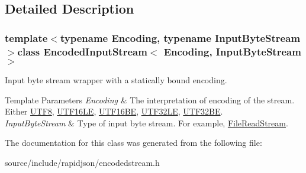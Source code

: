 \subsection{Detailed Description}
\subsubsection*{template$<$typename Encoding, typename Input\+Byte\+Stream$>$class Encoded\+Input\+Stream$<$ Encoding, Input\+Byte\+Stream $>$}

Input byte stream wrapper with a statically bound encoding. 


\begin{DoxyTemplParams}{Template Parameters}
{\em Encoding} & The interpretation of encoding of the stream. Either \hyperlink{struct_u_t_f8}{U\+T\+F8}, \hyperlink{struct_u_t_f16_l_e}{U\+T\+F16\+L\+E}, \hyperlink{struct_u_t_f16_b_e}{U\+T\+F16\+B\+E}, \hyperlink{struct_u_t_f32_l_e}{U\+T\+F32\+L\+E}, \hyperlink{struct_u_t_f32_b_e}{U\+T\+F32\+B\+E}. \\
\hline
{\em Input\+Byte\+Stream} & Type of input byte stream. For example, \hyperlink{class_file_read_stream}{File\+Read\+Stream}. \\
\hline
\end{DoxyTemplParams}


The documentation for this class was generated from the following file\+:\begin{DoxyCompactItemize}
\item 
source/include/rapidjson/encodedstream.\+h\end{DoxyCompactItemize}
